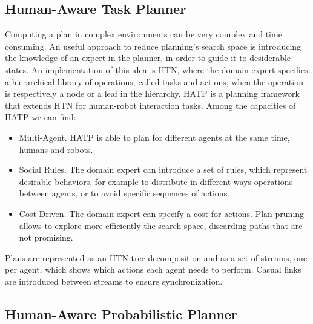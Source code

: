 \subsection{Human-Aware Task Planner}
Computing a plan in complex environments can be very complex and time consuming. An useful approach to reduce planning's search space is introducing the knowledge of an expert in the planner, in order to guide it to desiderable states. An implementation of this idea is HTN, where the domain expert specifies a hierarchical library of operations, called tasks and actions, when the operation is respectively a node or a leaf in the hierarchy.  HATP is a planning framework that extends HTN for human-robot interaction tasks. Among the capacities of HATP we can find:
\begin{itemize}
\item Multi-Agent. HATP is able to plan for different agents at the same time, humans and robots.
\item Social Rules. The domain expert can introduce a set of rules, which represent desirable behaviors, for example to distribute in different ways operations between agents, or to avoid specific sequences of actions.
\item Cost Driven. The domain expert can specify a cost for actions. Plan pruning allows to explore more efficiently the search space, discarding paths that are not promising.
\end{itemize} 

Plans are represented as an HTN tree decomposition and as a set of streams, one per agent, which shows which actions each agent needs to perform. Casual links are introduced between streams to ensure synchronization.

\subsection{Human-Aware Probabilistic Planner}
\label{subsec-plan_management_happ}



